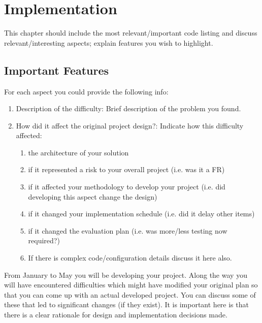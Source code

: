 \chapter{Implementation}
\label{chap:imp}
This chapter should include the most relevant/important code listing and discuss relevant/interesting aspects; explain features you wish to highlight. 

\section{Important Features}
For each aspect you could provide the following info:
\begin{enumerate}
    \item Description of the difficulty: Brief description of the problem you found.
    \item How did it affect the original project design?: Indicate how this difficulty affected:
    \begin{enumerate}
        \item the architecture of your solution
        \item if it represented a risk to your overall project (i.e. was it a FR)
        \item if it affected your methodology to develop your project (i.e. did developing this aspect change the design)
        \item if it changed your implementation schedule (i.e. did it delay other items)
        \item if it changed the evaluation plan (i.e. was more/less testing now required?)
    \item If there is complex code/configuration details discuss it here also.
    \end{enumerate}
\end{enumerate}

From January to May you will be developing your project. Along the way you will have encountered difficulties which might have modified your original plan so that you can come up with an actual developed project. You can discuss some of these that led to significant changes (if they exist). It is important here is that there is a clear rationale for design and implementation decisions made.